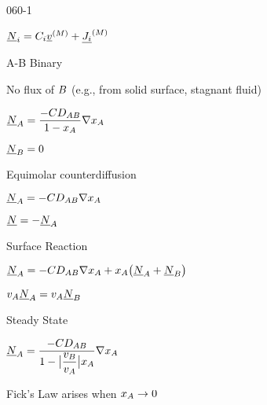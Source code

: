 \begin{mitframe}{060-1}
\begin{listone}
	\item $\uline\nummoles_{\state}=\conc_{\state}\uline{\vvel}^{(M)}+\uline{\molspecflux}^{(M)}$
    \item A-B Binary
    	\begin{listtwo}
        	\item No flux of $\exergy$ (e.g., from solid surface, stagnant fluid)
            	\begin{listthree}
                	\item $\uline{\nummoles}_{\helmholtz}=\dfrac{-\conc\elecdisplace_{\helmholtz\exergy}}{1-\disp_{\helmholtz}}\nabla\disp_{\helmholtz}$
                    \item $\uline{\nummoles}_{\exergy}=0$
                \end{listthree}
                \item Equimolar counterdiffusion
                \begin{listthree}
                \item $\uline{\nummoles}_{\helmholtz}=-\conc\elecdisplace_{\helmholtz\exergy}\nabla\disp_{\helmholtz}$
                \item $\uline{\nummoles}=-\uline{\nummoles}_{\helmholtz}$
                \end{listthree}
                \item Surface Reaction
                \begin{listthree}
                	\item $\uline{\nummoles}_{\helmholtz}=-\conc\elecdisplace_{\helmholtz\exergy}\nabla\disp_{\helmholtz}+\disp_{\helmholtz}\big(\uline{\nummoles}_{\helmholtz}+\uline{\nummoles}_{\exergy}\big)$
                    \item $\vvel_{\helmholtz}\uline{\nummoles}_{\helmholtz}=\vvel_{\helmholtz}\uline{\nummoles}_{\exergy}$
                    \item Steady State
                    	\begin{listfour}
                        	\item $\uline{\nummoles}_{\helmholtz}=\dfrac{-\conc\elecdisplace_{\helmholtz\exergy}}{1-\big|\dfrac{\vvel_{\exergy}}{\vvel_{\helmholtz}}\big|\disp_{\helmholtz}}\nabla\disp_{\helmholtz}$
                            
                        \end{listfour}
                \end{listthree}
        	\item Fick's Law arises when $\disp_{\helmholtz}\rightarrow{0}$
            

\end{listtwo}
\end{listone}
\end{mitframe}
